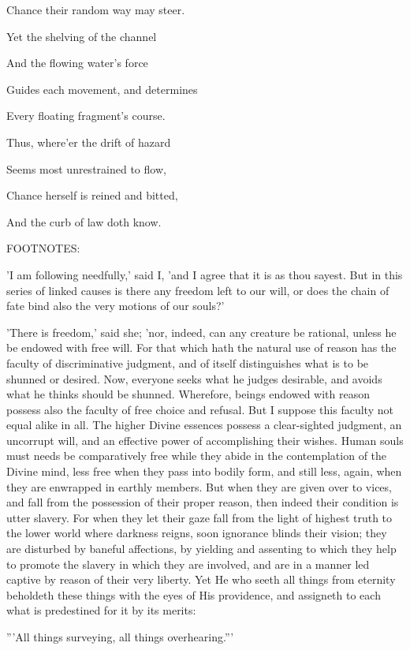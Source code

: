 Chance their random way may steer.

Yet the shelving of the channel

And the flowing water's force

Guides each movement, and determines

Every floating fragment's course.

Thus, where'er the drift of hazard

Seems most unrestrained to flow,

Chance herself is reined and bitted,

And the curb of law doth know.

FOOTNOTES:


'I am following needfully,' said I, 'and I agree that it is as thou
sayest. But in this series of linked causes is there any freedom left to
our will, or does the chain of fate bind also the very motions of our
souls?'

'There is freedom,' said she; 'nor, indeed, can any creature be
rational, unless he be endowed with free will. For that which hath the
natural use of reason has the faculty of discriminative judgment, and of
itself distinguishes what is to be shunned or desired. Now, everyone
seeks what he judges desirable, and avoids what he thinks should be
shunned. Wherefore, beings endowed with reason possess also the faculty
of free choice and refusal. But I suppose this faculty not equal alike
in all. The higher Divine essences possess a clear-sighted judgment, an
uncorrupt will, and an effective power of accomplishing their wishes.
Human souls must needs be comparatively free while they abide in the
contemplation of the Divine mind, less free when they pass into bodily
form, and still less, again, when they are enwrapped in earthly members.
But when they are given over to vices, and fall from the possession of
their proper reason, then indeed their condition is utter slavery. For
when they let their gaze fall from the light of highest truth to the
lower world where darkness reigns, soon ignorance blinds their vision;
they are disturbed by baneful affections, by yielding and assenting to
which they help to promote the slavery in which they are involved, and
are in a manner led captive by reason of their very liberty. Yet He who
seeth all things from eternity beholdeth these things with the eyes of
His providence, and assigneth to each what is predestined for it by its
merits:

'''All things surveying, all things overhearing.'''

